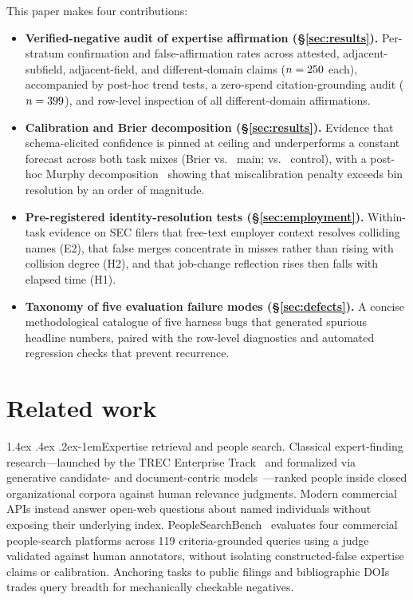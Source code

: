 \documentclass[11pt]{article}
\makeatletter
\renewcommand\paragraph{\@startsection{paragraph}{4}{\z@}%
  {1.4ex \@plus .4ex \@minus .2ex}{-1em}{\normalfont\normalsize\bfseries}}
\makeatother
\begin{document}
This paper makes four contributions:
\begin{itemize}\setlength\itemsep{1pt}\setlength\parskip{0pt}
\item \textbf{Verified-negative audit of expertise affirmation (\S\ref{sec:results}).} Per-stratum confirmation and false-affirmation rates across attested, adjacent-subfield, adjacent-field, and different-domain claims ($n=250{}$ each), accompanied by post-hoc trend tests, a zero-spend citation-grounding audit ($n=399{}$), and row-level inspection of all \tiCtlK{} different-domain affirmations.
\item \textbf{Calibration and Brier decomposition (\S\ref{sec:results}).} Evidence that schema-elicited confidence is pinned at ceiling and underperforms a constant forecast across both task mixes (Brier \tiBrier{} vs.\ \tiBrierBase{} main; \tiCtlBrier{} vs.\ \tiPostCtlUnc{} control), with a post-hoc Murphy decomposition~\citep{murphy1973brier} showing that miscalibration penalty exceeds bin resolution by an order of magnitude.
\item \textbf{Pre-registered identity-resolution tests (\S\ref{sec:employment}).} Within-task evidence on SEC filers that free-text employer context resolves colliding names (E2), that false merges concentrate in misses rather than rising with collision degree (H2), and that job-change reflection rises then falls with elapsed time (H1).
\item \textbf{Taxonomy of five evaluation failure modes (\S\ref{sec:defects}).} A concise methodological catalogue of five harness bugs that generated spurious headline numbers, paired with the row-level diagnostics and automated regression checks that prevent recurrence.
\end{itemize}

\section{Related work}
\label{sec:related}

\paragraph{Expertise retrieval and people search.}
Classical expert-finding research---launched by the TREC Enterprise Track~\citep{craswell2005trec} and formalized via generative candidate- and document-centric models~\citep{balog2006formal,balog2012expertise}---ranked people inside closed organizational corpora against human relevance judgments. Modern commercial APIs instead answer open-web questions about named individuals without exposing their underlying index. PeopleSearchBench~\citep{shi2026peoplesearchbench} evaluates four commercial people-search platforms across 119 criteria-grounded queries using a judge validated against human annotators, without isolating constructed-false expertise claims or calibration. Anchoring tasks to public filings and bibliographic DOIs trades query breadth for mechanically checkable negatives.
\end{document}

